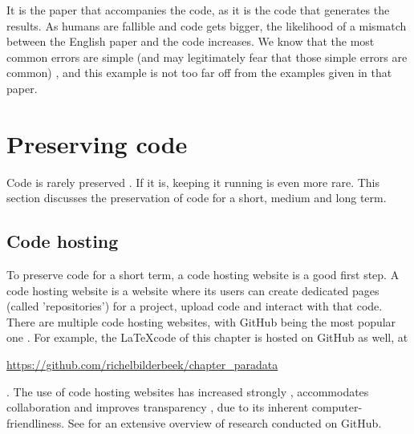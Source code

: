 It is the paper that accompanies the code,
as it is the code that generates the results.
As humans are fallible and code gets bigger, the likelihood of
a mismatch between the English paper and the code increases.
We know that the most common errors are 
simple (and may legitimately fear that those simple errors are common) 
\cite{baggerly2009deriving, vable2021code},
and this example is not too far off from the
examples given in that paper.

\section{Preserving code}


Code is rarely preserved \cite{barnes2010publish}.
If it is, keeping it running is even more rare.
This section discusses the preservation of code for a short, medium
and long term.

\subsection{Code hosting}\label{subsec:code-hosting}

To preserve code for a short term, 
a code hosting website is a good first step.
A code hosting website is a website where 
its users can create dedicated pages (called 'repositories')
for a project, upload code and interact with that code.
There are multiple code hosting websites, 
with GitHub being the most popular one \cite{cosentino2017systematic}.
For example, the \LaTeX code of this chapter is hosted on GitHub 
as well, at \begin{sloppypar}\url{https://github.com/richelbilderbeek/chapter_paradata}\end{sloppypar}.
The use of code hosting websites
has increased strongly \cite{russell2018large},
accommodates collaboration \cite{perez2016ten}
and improves transparency \cite{gorgolewski2016practical},
due to its inherent computer-friendliness.
See \cite{cosentino2017systematic} for an extensive overview of
research conducted on GitHub.

